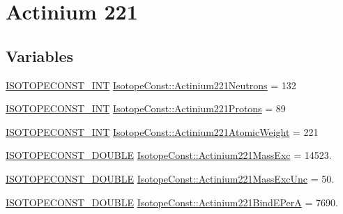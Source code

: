 \hypertarget{group___isotope_const-_actinium-_ac221}{}\section{Actinium 221}
\label{group___isotope_const-_actinium-_ac221}
\subsection*{Variables}
\begin{DoxyCompactItemize}
\item 
\mbox{\hyperlink{group___isotope_const-_macros_ga5f18360b3e99483a35c32d789e62621c}{I\+S\+O\+T\+O\+P\+E\+C\+O\+N\+S\+T\+\_\+\+I\+NT}} \mbox{\hyperlink{group___isotope_const-_actinium-_ac221_gadccdf8b0178f06ce1461b85b93ef373e}{Isotope\+Const\+::\+Actinium221\+Neutrons}} = 132
\item 
\mbox{\hyperlink{group___isotope_const-_macros_ga5f18360b3e99483a35c32d789e62621c}{I\+S\+O\+T\+O\+P\+E\+C\+O\+N\+S\+T\+\_\+\+I\+NT}} \mbox{\hyperlink{group___isotope_const-_actinium-_ac221_ga976491bd00a2213e44d82603d10f742e}{Isotope\+Const\+::\+Actinium221\+Protons}} = 89
\item 
\mbox{\hyperlink{group___isotope_const-_macros_ga5f18360b3e99483a35c32d789e62621c}{I\+S\+O\+T\+O\+P\+E\+C\+O\+N\+S\+T\+\_\+\+I\+NT}} \mbox{\hyperlink{group___isotope_const-_actinium-_ac221_ga0a2c9336430921bf5c47d4fa428960ae}{Isotope\+Const\+::\+Actinium221\+Atomic\+Weight}} = 221
\item 
\mbox{\hyperlink{group___isotope_const-_macros_ga8f45a7272ce02c0b4c65c44636ed719a}{I\+S\+O\+T\+O\+P\+E\+C\+O\+N\+S\+T\+\_\+\+D\+O\+U\+B\+LE}} \mbox{\hyperlink{group___isotope_const-_actinium-_ac221_ga279213a4961defac507a4a034115a34d}{Isotope\+Const\+::\+Actinium221\+Mass\+Exc}} = 14523.
\item 
\mbox{\hyperlink{group___isotope_const-_macros_ga8f45a7272ce02c0b4c65c44636ed719a}{I\+S\+O\+T\+O\+P\+E\+C\+O\+N\+S\+T\+\_\+\+D\+O\+U\+B\+LE}} \mbox{\hyperlink{group___isotope_const-_actinium-_ac221_ga9f8e1ee40e67ba404e666b34762a1f85}{Isotope\+Const\+::\+Actinium221\+Mass\+Exc\+Unc}} = 50.
\item 
\mbox{\hyperlink{group___isotope_const-_macros_ga8f45a7272ce02c0b4c65c44636ed719a}{I\+S\+O\+T\+O\+P\+E\+C\+O\+N\+S\+T\+\_\+\+D\+O\+U\+B\+LE}} \mbox{\hyperlink{group___isotope_const-_actinium-_ac221_ga6b2bc40ffb1d0aa4c3a5b00796c7c869}{Isotope\+Const\+::\+Actinium221\+Bind\+E\+PerA}} = 7690.
\item 

\end{DoxyCompactItemize}
